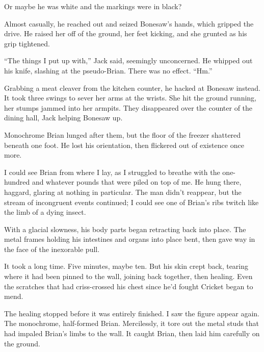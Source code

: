 Or maybe he was white and the markings were in black?



Almost casually, he reached out and seized Bonesaw's hands, which gripped the drive.  He raised her off of the ground, her feet kicking, and she grunted as his grip tightened.



``The things I put up with,'' Jack said, seemingly unconcerned.  He whipped out his knife, slashing at the pseudo-Brian.  There was no effect.  ``Hm.''



Grabbing a meat cleaver from the kitchen counter, he hacked at Bonesaw instead.  It took three swings to sever her arms at the wrists.  She hit the ground running, her stumps jammed into her armpits.  They disappeared over the counter of the dining hall, Jack helping Bonesaw up.



Monochrome Brian lunged after them, but the floor of the freezer shattered beneath one foot.  He lost his orientation, then flickered out of existence once more.



I could see Brian from where I lay, as I struggled to breathe with the one-hundred and whatever pounds that were piled on top of me.  He hung there, haggard, glaring at nothing in particular.  The man didn't reappear, but the stream of incongruent events continued; I could see one of Brian's ribs twitch like the limb of a dying insect.



With a glacial slowness, his body parts began retracting back into place.  The metal frames holding his intestines and organs into place bent, then gave way in the face of the inexorable pull.



It took a long time.  Five minutes, maybe ten.  But his skin crept back, tearing where it had been pinned to the wall, joining back together, then healing.  Even the scratches that had criss-crossed his chest since he'd fought Cricket began to mend.



The healing stopped before it was entirely finished.  I saw the figure appear again.  The monochrome, half-formed Brian.  Mercilessly, it tore out the metal studs that had impaled Brian's limbs to the wall.  It caught Brian, then laid him carefully on the ground.



